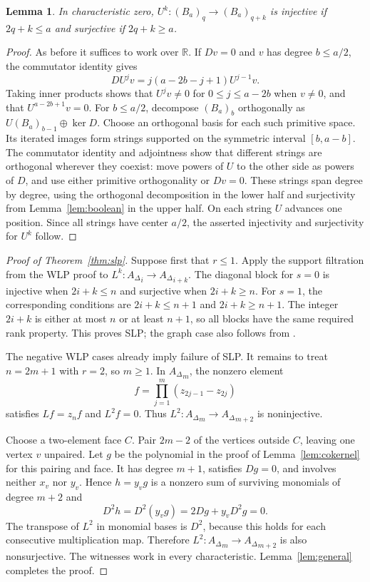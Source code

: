 \documentclass[11pt]{article}
\newtheorem{lemma}[theorem]{Lemma}
\theoremstyle{remark}
\newcommand{\A}{{A_{\Delta}}}
\begin{document}
\begin{lemma}\label{lem:booleanpowers}
In characteristic zero, $U^k:(B_a)_q\to(B_a)_{q+k}$ is injective if $2q+k\leq a$ and surjective if $2q+k\geq a$.
\end{lemma}
\begin{proof}
As before it suffices to work over $\mathbb R$. If $Dv=0$ and $v$ has degree $b\leq a/2$, the commutator identity gives
\[
D U^jv=j(a-2b-j+1)U^{j-1}v.
\]
Taking inner products shows that $U^jv\ne0$ for $0\leq j\leq a-2b$ when $v\ne0$, and that $U^{a-2b+1}v=0$. For $b\leq a/2$, decompose $(B_a)_b$ orthogonally as $U(B_a)_{b-1}\oplus\ker D$. Choose an orthogonal basis for each such primitive space. Its iterated images form strings supported on the symmetric interval $[b,a-b]$. The commutator identity and adjointness show that different strings are orthogonal wherever they coexist: move powers of $U$ to the other side as powers of $D$, and use either primitive orthogonality or $Dv=0$. These strings span degree by degree, using the orthogonal decomposition in the lower half and surjectivity from Lemma~\ref{lem:boolean} in the upper half. On each string $U$ advances one position. Since all strings have center $a/2$, the asserted injectivity and surjectivity for $U^k$ follow.
\end{proof}

\begin{proof}[Proof of Theorem~\ref{thm:slp}]
Suppose first that $r\leq1$. Apply the support filtration from the WLP proof to $L^k:\A_i\to\A_{i+k}$. The diagonal block for $s=0$ is injective when $2i+k\leq n$ and surjective when $2i+k\geq n$. For $s=1$, the corresponding conditions are $2i+k\leq n+1$ and $2i+k\geq n+1$. The integer $2i+k$ is either at most $n$ or at least $n+1$, so all blocks have the same required rank property. This proves SLP; the graph case also follows from \cite[Proposition 3.2]{HN}.

The negative WLP cases already imply failure of SLP. It remains to treat $n=2m+1$ with $r=2$, so $m\geq1$. In $\A_m$, the nonzero element
\[
f=\prod_{j=1}^{m}(z_{2j-1}-z_{2j})
\]
satisfies $Lf=z_n f$ and $L^2f=0$. Thus $L^2:\A_m\to\A_{m+2}$ is noninjective.

Choose a two-element face $C$. Pair $2m-2$ of the vertices outside $C$, leaving one vertex $v$ unpaired. Let $g$ be the polynomial in the proof of Lemma~\ref{lem:cokernel} for this pairing and face. It has degree $m+1$, satisfies $Dg=0$, and involves neither $x_v$ nor $y_v$. Hence $h=y_vg$ is a nonzero sum of surviving monomials of degree $m+2$ and
\[
D^2h=D^2(y_vg)=2Dg+y_vD^2g=0.
\]
The transpose of $L^2$ in monomial bases is $D^2$, because this holds for each consecutive multiplication map. Therefore $L^2:\A_m\to\A_{m+2}$ is also nonsurjective. The witnesses work in every characteristic. Lemma~\ref{lem:general} completes the proof.
\end{proof}
\end{document}
